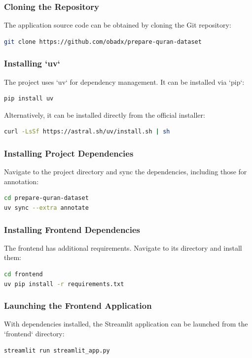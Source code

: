 \subsubsection{Cloning the Repository}
The application source code can be obtained by cloning the Git repository:
\begin{lstlisting}[language=bash]
git clone https://github.com/obadx/prepare-quran-dataset
\end{lstlisting}

\subsubsection{Installing `uv`}
The project uses `uv` for dependency management. It can be installed via `pip`:
\begin{lstlisting}[language=bash]
pip install uv
\end{lstlisting}
Alternatively, it can be installed directly from the official installer:
\begin{lstlisting}[language=bash]
curl -LsSf https://astral.sh/uv/install.sh | sh
\end{lstlisting}

\subsubsection{Installing Project Dependencies}
Navigate to the project directory and sync the dependencies, including those for annotation:
\begin{lstlisting}[language=bash]
cd prepare-quran-dataset
uv sync --extra annotate
\end{lstlisting}

\subsubsection{Installing Frontend Dependencies}
The frontend has additional requirements. Navigate to its directory and install them:
\begin{lstlisting}[language=bash]
cd frontend
uv pip install -r requirements.txt
\end{lstlisting}

\subsubsection{Launching the Frontend Application}
With dependencies installed, the Streamlit application can be launched from the `frontend` directory:
\begin{lstlisting}[language=bash]
streamlit run streamlit_app.py
\end{lstlisting}

